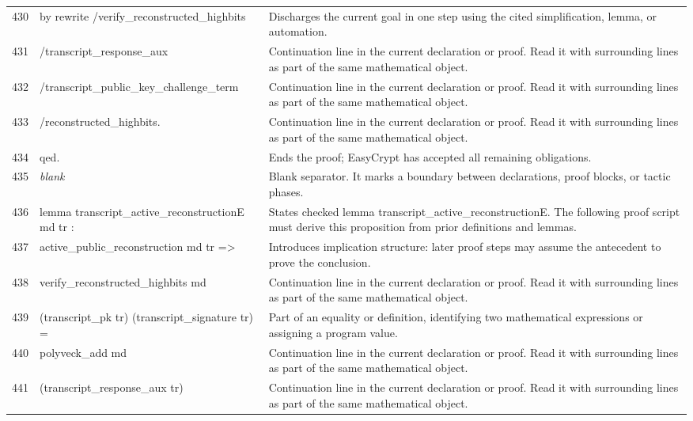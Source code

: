 \documentclass[10pt]{article}
\begin{document}
\begin{longtable}{r L{0.53\textwidth} L{0.37\textwidth}}
430 & {\ttfamily\scriptsize by rewrite /verify\_reconstructed\_highbits} & Discharges the current goal in one step using the cited simplification, lemma, or automation. \\
431 & {\ttfamily\scriptsize            /transcript\_response\_aux} & Continuation line in the current declaration or proof.  Read it with surrounding lines as part of the same mathematical object. \\
432 & {\ttfamily\scriptsize            /transcript\_public\_key\_challenge\_term} & Continuation line in the current declaration or proof.  Read it with surrounding lines as part of the same mathematical object. \\
433 & {\ttfamily\scriptsize            /reconstructed\_highbits.} & Continuation line in the current declaration or proof.  Read it with surrounding lines as part of the same mathematical object. \\
434 & {\ttfamily\scriptsize qed.} & Ends the proof; EasyCrypt has accepted all remaining obligations. \\
435 & {\ttfamily\scriptsize \emph{blank}} & Blank separator.  It marks a boundary between declarations, proof blocks, or tactic phases. \\
436 & {\ttfamily\scriptsize lemma transcript\_active\_reconstructionE md tr :} & States checked lemma transcript\_active\_reconstructionE.  The following proof script must derive this proposition from prior definitions and lemmas. \\
437 & {\ttfamily\scriptsize   active\_public\_reconstruction md tr =>} & Introduces implication structure: later proof steps may assume the antecedent to prove the conclusion. \\
438 & {\ttfamily\scriptsize   verify\_reconstructed\_highbits md} & Continuation line in the current declaration or proof.  Read it with surrounding lines as part of the same mathematical object. \\
439 & {\ttfamily\scriptsize     (transcript\_pk tr) (transcript\_signature tr) =} & Part of an equality or definition, identifying two mathematical expressions or assigning a program value. \\
440 & {\ttfamily\scriptsize   polyveck\_add md} & Continuation line in the current declaration or proof.  Read it with surrounding lines as part of the same mathematical object. \\
441 & {\ttfamily\scriptsize     (transcript\_response\_aux tr)} & Continuation line in the current declaration or proof.  Read it with surrounding lines as part of the same mathematical object. \\

\end{longtable}
\end{document}
